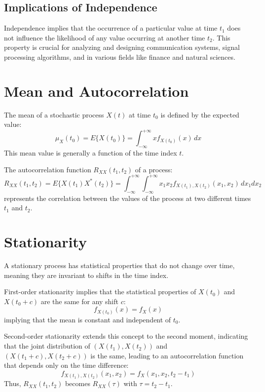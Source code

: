 \subsection*{Implications of Independence}

Independence implies that the occurrence of a particular value at time \( t_1 \) does not influence the likelihood of any value occurring at another time \( t_2 \). This property is crucial for analyzing and designing communication systems, signal processing algorithms, and in various fields like finance and natural sciences.


\section*{Mean and Autocorrelation}

The mean of a stochastic process \( X(t) \) at time \( t_0 \) is defined by the expected value:
\[ \mu_X(t_0) = E\{X(t_0)\} = \int_{-\infty}^{+\infty} x f_{X(t_0)}(x) \, dx \]
This mean value is generally a function of the time index \( t \).

The autocorrelation function \( R_{XX}(t_1, t_2) \) of a process:
\[ R_{XX}(t_1, t_2) = E\{X(t_1)X^*(t_2)\} = \int_{-\infty}^{+\infty} \int_{-\infty}^{+\infty} x_1 x_2 f_{X(t_1),X(t_2)}(x_1, x_2) \, dx_1 dx_2 \]
represents the correlation between the values of the process at two different times \( t_1 \) and \( t_2 \).

\section*{Stationarity}

A stationary process has statistical properties that do not change over time, meaning they are invariant to shifts in the time index.

First-order stationarity implies that the statistical properties of \( X(t_0) \) and \( X(t_0 + c) \) are the same for any shift \( c \):
\[ f_{X(t_0)}(x) = f_{X}(x) \]
implying that the mean is constant and independent of \( t_0 \).

Second-order stationarity extends this concept to the second moment, indicating that the joint distribution of \( (X(t_1), X(t_2)) \) and \( (X(t_1 + c), X(t_2 + c)) \) is the same, leading to an autocorrelation function that depends only on the time difference:
\[ f_{X(t_1),X(t_2)}(x_1, x_2) = f_{X}(x_1, x_2, t_2 - t_1) \]
Thus, \( R_{XX}(t_1, t_2) \) becomes \( R_{XX}(\tau) \) with \( \tau = t_2 - t_1 \).


